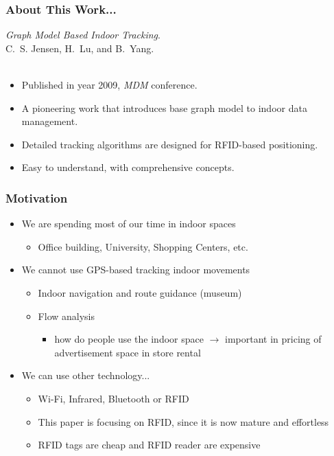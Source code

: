 \begin{frame}
\frametitle{About This Work...}

\emph{Graph Model Based Indoor Tracking}.~\cite{DBLP:conf/mdm/JensenLY09} \\
C.~S. Jensen, H.~Lu, and B.~Yang.\\~\\

\begin{itemize}
  \item Published in year 2009, \emph{MDM} conference.
  \item A pioneering work that introduces base graph model to indoor data management.
  \item Detailed tracking algorithms are designed for RFID-based positioning.
  \item Easy to understand, with comprehensive concepts.
\end{itemize}

\end{frame}


\begin{frame}
\frametitle{Motivation}

\begin{itemize}
  \item We are spending most of our time in indoor spaces
      \begin{itemize}
        \item Office building, University, Shopping Centers, etc.
      \end{itemize}
  \item We cannot use GPS-based tracking indoor movements
      \begin{itemize}
        \item Indoor navigation and route guidance (museum)
        \item Flow analysis
            \begin{itemize}
              \item how do people use the indoor space $\rightarrow$ important in pricing of advertisement space in store rental
            \end{itemize}
      \end{itemize}
  \item We can use other technology...
      \begin{itemize}
        \item Wi-Fi, Infrared, Bluetooth or RFID
        \item This paper is focusing on RFID, since it is now mature and effortless
        \item RFID tags are cheap and RFID reader are expensive
      \end{itemize}
\end{itemize}

\end{frame}

